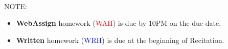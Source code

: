 \documentclass[11pt,fleqn]{article}
\begin{document}
\vspace*{-0.7in}

\begin{center}
  \LARGE
  \\
\end{center}

NOTE: \begin{itemize}
\item \textbf{WebAssign} homework (\textcolor{red}{WAH}) is due by 10PM on the due date. \item \textbf{Written} homework (\textcolor{blue}{WRH}) is due at the beginning of Recitation.\end{itemize}
\end{document}
